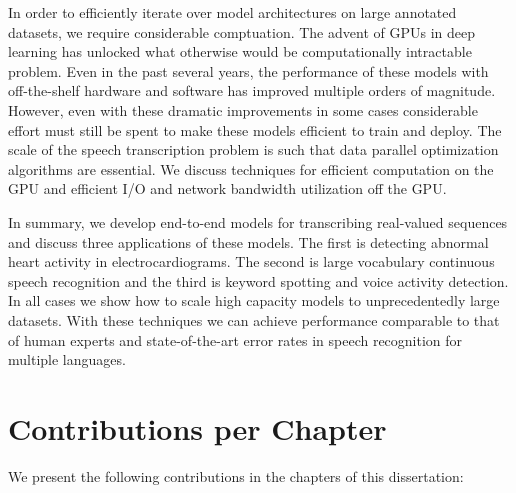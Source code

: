 In order to efficiently iterate over model architectures on large annotated
datasets, we require considerable comptuation. The advent of GPUs in deep
learning has unlocked what otherwise would be computationally intractable
problem. Even in the past several years, the performance of these models with
off-the-shelf hardware and software has improved multiple orders of magnitude.
However, even with these dramatic improvements in some cases considerable
effort must still be spent to make these models efficient to train and deploy.
The scale of the speech transcription problem is such that data parallel
optimization algorithms are essential. We discuss techniques for efficient
computation on the GPU and efficient I/O and network bandwidth utilization off
the GPU.

In summary, we develop end-to-end models for transcribing real-valued sequences
and discuss three applications of these models. The first is detecting abnormal
heart activity in electrocardiograms. The second is large vocabulary continuous
speech recognition and the third is keyword spotting and voice activity
detection. In all cases we show how to scale high capacity models to
unprecedentedly large datasets. With these techniques we can achieve
performance comparable to that of human experts and state-of-the-art error
rates in speech recognition for multiple languages.

\section{Contributions per Chapter}

We present the following contributions in the chapters of this dissertation:

